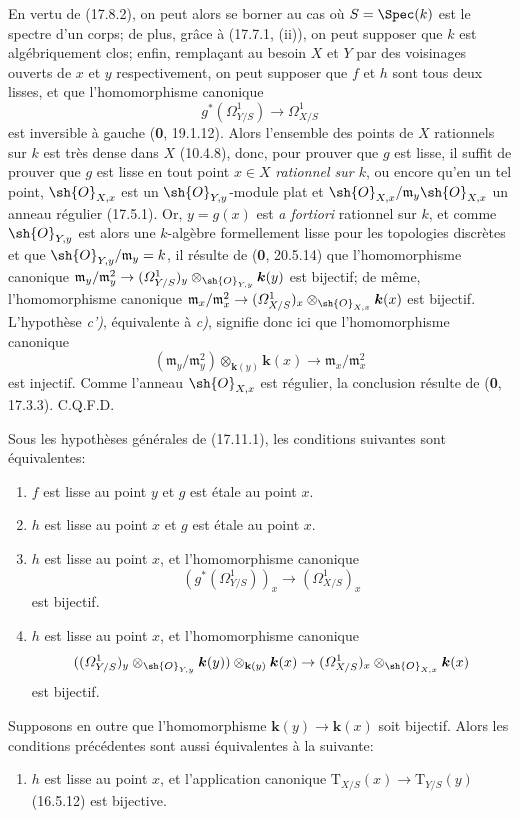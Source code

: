 En vertu de (17.8.2), on peut alors se borner au cas où $S=\Spec(k)$ est le spectre d'un corps; de plus, grâce à (17.7.1, (ii)), on peut supposer que $k$ est algébriquement clos; enfin, remplaçant au besoin $X$ et $Y$ par des voisinages ouverts de $x$ et $y$ respectivement, on peut supposer que $f$ et $h$ sont tous deux lisses, et que l'homomorphisme canonique
\[
g^*(\varOmega^1_{Y/S})\to\varOmega^1_{X/S}
\]
est inversible à gauche (\textbf{0}, 19.1.12). Alors l'ensemble des points de $X$ rationnels sur $k$ est très dense dans $X$ (10.4.8), donc, pour prouver que $g$ est lisse, il suffit de prouver que $g$ est lisse en tout point $x\in X$ \emph{rationnel sur $k$}, ou encore qu'en un tel point, $\sh{O}_{X,x}$ est un $\sh{O}_{Y,y}$-module plat et $\sh{O}_{X,x}/\mathfrak m_y\sh{O}_{X,x}$ un anneau régulier (17.5.1). Or, $y=g(x)$ est
\emph{a fortiori} rationnel sur $k$, et comme $\sh{O}_{Y,y}$ est alors une $k$-algèbre formellement lisse pour les topologies discrètes et que $\sh{O}_{Y,y}/\mathfrak m_y=k$, il résulte de (\textbf{0}, 20.5.14) que l'homomorphisme canonique $\mathfrak m_y/\mathfrak m_y^2\to(\varOmega^1_{Y/S})_y\otimes_{\sh{O}_{Y,y}}\boldsymbol{k}(y)$ est bijectif; de même, l'homomorphisme canonique $\mathfrak m_x/\mathfrak m_x^2\to(\varOmega^1_{X/S})_x\otimes_{\sh{O}_{X,x}}\boldsymbol{k}(x)$ est bijectif. L'hypothèse \emph{c')}, équivalente à \emph{c)}, signifie donc ici que l'homomorphisme canonique
\[
(\mathfrak m_y/\mathfrak m_y^2)\otimes_{\mathbf{k}(y)}\boldsymbol{k}(x)\to\mathfrak m_x/\mathfrak m_x^2
\]
est injectif. Comme l'anneau $\sh{O}_{X,x}$ est régulier, la conclusion résulte de (\textbf{0}, 17.3.3). C.Q.F.D.

\begin{corollary}[17.11.2]
\label{IV.17.11.2}
Sous les hypothèses générales de \textup{(17.11.1)}, les conditions suivantes sont équivalentes:
\begin{enumerate}
  \item[\textup{a)}] $f$ est lisse au point $y$ et $g$ est étale au point $x$.
  \item[\textup{b)}] $h$ est lisse au point $x$ et $g$ est étale au point $x$.
  \item[\textup{c)}] $h$ est lisse au point $x$, et l'homomorphisme canonique
  \[
  (g^*(\varOmega^1_{Y/S}))_x\to(\varOmega^1_{X/S})_x
  \]
  est bijectif.
  \item[\textup{c$'$)}] $h$ est lisse au point $x$, et l'homomorphisme canonique
  \[
  ((\varOmega^1_{Y/S})_y\otimes_{\sh{O}_{Y,y}}\boldsymbol{k}(y))\otimes_{\mathbf{k}(y)}\boldsymbol{k}(x)\to(\varOmega^1_{X/S})_x\otimes_{\sh{O}_{X,x}}\boldsymbol{k}(x)
  \]
  est bijectif.
\end{enumerate}

Supposons en outre que l'homomorphisme $\boldsymbol{k}(y)\to\boldsymbol{k}(x)$ soit bijectif. Alors les conditions précédentes sont aussi équivalentes à la suivante:
\begin{enumerate}
  \item[\textup{d)}] $h$ est lisse au point $x$, et l'application canonique $\mathrm{T}_{X/S}(x)\to\mathrm{T}_{Y/S}(y)$ \textup{(16.5.12)} est bijective.
\end{enumerate}
\end{corollary}

